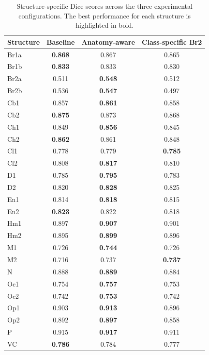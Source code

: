 \begin{table}[htbp]
\centering
\caption{Structure-specific Dice scores across the three experimental configurations. The best performance for each structure is highlighted in bold.}
\label{tab:per_structure_dice}
\begin{tabular}{lccc}
\hline
\textbf{Structure} & \textbf{Baseline} & \textbf{Anatomy-aware} & \textbf{Class-specific Br2} \\
\hline
Br1a & \textbf{0.868} & 0.867 & 0.865 \\
Br1b & \textbf{0.833} & 0.833 & 0.830 \\
Br2a & 0.511 & \textbf{0.548} & 0.512 \\
Br2b & 0.536 & \textbf{0.547} & 0.497 \\
Cb1 & 0.857 & \textbf{0.861} & 0.858 \\
Cb2 & \textbf{0.875} & 0.873 & 0.868 \\
Ch1 & 0.849 & \textbf{0.856} & 0.845 \\
Ch2 & \textbf{0.862} & 0.861 & 0.848 \\
Cl1 & 0.778 & 0.779 & \textbf{0.785} \\
Cl2 & 0.808 & \textbf{0.817} & 0.810 \\
D1 & 0.785 & \textbf{0.795} & 0.783 \\
D2 & 0.820 & \textbf{0.828} & 0.825 \\
En1 & 0.814 & \textbf{0.818} & 0.815 \\
En2 & \textbf{0.823} & 0.822 & 0.818 \\
Hm1 & 0.897 & \textbf{0.907} & 0.901 \\
Hm2 & 0.895 & \textbf{0.899} & 0.896 \\
M1 & 0.726 & \textbf{0.744} & 0.726 \\
M2 & 0.716 & 0.737 & \textbf{0.737} \\
N & 0.888 & \textbf{0.889} & 0.884 \\
Oc1 & 0.754 & \textbf{0.757} & 0.753 \\
Oc2 & 0.742 & \textbf{0.753} & 0.742 \\
Op1 & 0.903 & \textbf{0.913} & 0.896 \\
Op2 & 0.892 & \textbf{0.897} & 0.858 \\
P & 0.915 & \textbf{0.917} & 0.911 \\
VC & \textbf{0.786} & 0.784 & 0.777 \\
\hline
\end{tabular}
\end{table}
